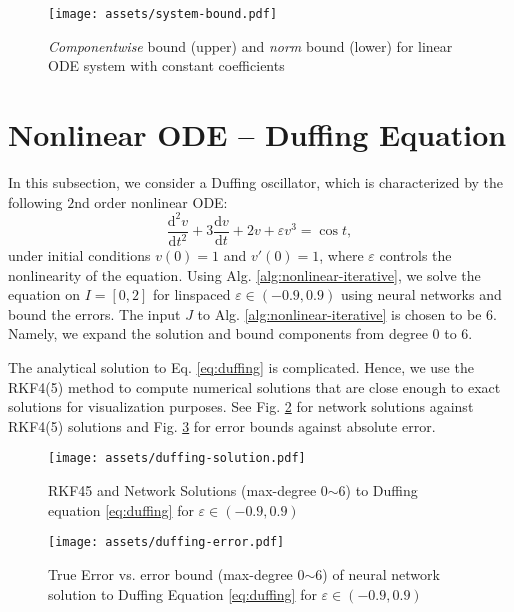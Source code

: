     \begin{figure}[!ht]
        \centering
        \texttt{[image: assets/system-bound.pdf]}
        \caption{\textit{Componentwise} bound (upper) and \textit{norm} bound (lower) for linear ODE system with constant coefficients}\label{fig:system-bound}
    \end{figure}

\section{Nonlinear ODE -- Duffing Equation} \label{section:experiment-duffing}
    In this subsection, we consider a Duffing oscillator, which is characterized by the following $2$nd order nonlinear ODE:
    {
        \begin{equation}\label{eq:duffing}
            \frac{\mathrm{d}^2 v}{\mathrm{d}t^2} + 3 \frac{\mathrm{d}v}{\mathrm{d}t} + 2v +\varepsilon v^3 = \cos t ,
        \end{equation}
    }
    under initial conditions $v(0) = 1$ and $v'(0) = 1$, where $\varepsilon$ controls the nonlinearity of the equation. 
    Using Alg. \ref{alg:nonlinear-iterative}, we solve the equation on $I=[0, 2]$ for linspaced $\varepsilon \in (-0.9, 0.9)$ using neural networks and bound the errors. 
    The input $J$ to Alg. \ref{alg:nonlinear-iterative} is chosen to be $6$. 
    Namely, we expand the solution and bound components from degree $0$ to $6$.

    The analytical solution to Eq. \eqref{eq:duffing} is complicated. 
    Hence, we use the RKF4(5) method to compute numerical solutions that are close enough to exact solutions for visualization purposes. 
    See Fig. \ref{fig:duffing-solution} for network solutions against RKF4(5) solutions and Fig. \ref{fig:duffing-error} for error bounds against absolute error.
    \begin{figure}[!ht]
        \centering
        \texttt{[image: assets/duffing-solution.pdf]}
        \caption{RKF45 and Network Solutions (max-degree 0$\sim$6) to Duffing equation \eqref{eq:duffing} for $\varepsilon \in (-0.9, 0.9)$}\label{fig:duffing-solution}
    \end{figure}
    \begin{figure}[!ht]
        \centering
        \texttt{[image: assets/duffing-error.pdf]}
        \caption{True Error vs. error bound (max-degree 0$\sim$6) of neural network solution to Duffing Equation \eqref{eq:duffing} for $\varepsilon \in (-0.9, 0.9)$}\label{fig:duffing-error}
    \end{figure}

